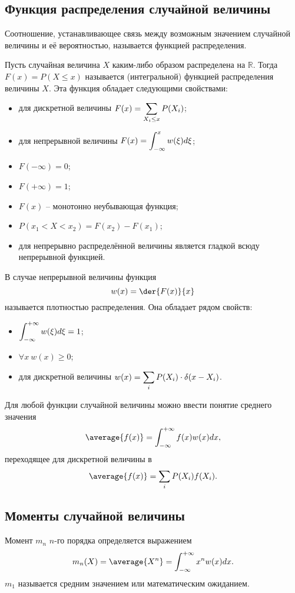 \subsection{Функция распределения случайной величины}

Соотношение, устанавливающее связь между возможным значением случайной величины
и её вероятностью, называется функцией распределения.

Пусть случайная величина \( X \) каким-либо образом распределена на
\( \mathbb{R} \). Тогда \( F(x) = P(X \le x) \) называется (интегральной)
функцией распределения величины \( X \). Эта функция обладает следующими
свойствами:
\begin{itemize}
    \item для дискретной величины \( \displaystyle F(x) = \sum_{X_i \le x}P(X_i) \);
    \item для непрерывной величины \( \displaystyle F(x) = \int_{-\infty}^x w(\xi)d\xi \);
    \item \( F(-\infty) = 0 \);
    \item \( F(+\infty) = 1 \);
    \item \( F(x) \) -- монотонно неубывающая функция;
    \item \( P(x_1 < X < x_2) = F(x_2) - F(x_1) \);
    \item для непрерывно распределённой величины является гладкой всюду
        непрерывной функцией.
\end{itemize}
В случае непрерывной величины функция
\[
    w(x) = \der{F(x)}{x}
\]
называется плотностью распределения. Она обладает рядом свойств:
\begin{itemize}
    \item \( \displaystyle \int_{-\infty}^{+\infty} w(\xi) d\xi = 1 \);
    \item \( \forall x\ w(x) \ge 0 \);
    \item для дискретной величины
        \( \displaystyle w(x) = \sum_i P(X_i) \cdot \delta(x - X_i) \).
\end{itemize}

Для любой функции случайной величины можно ввести понятие среднего значения
\[
    \average{f(x)} = \int_{-\infty}^{+\infty}f(x)w(x)dx,
\]
переходящее для дискретной величины в
\[
    \average{f(x)} = \sum_i P(X_i)f(X_i).
\]

\subsection{Моменты случайной величины}

Момент \( m_n \) \( n \)-го порядка определяется выражением
\[
    m_n(X) = \average{X^n} = \int_{-\infty}^{+\infty} x^n w(x) dx.
\]
\( m_1 \) называется средним значением или математическим ожиданием.

